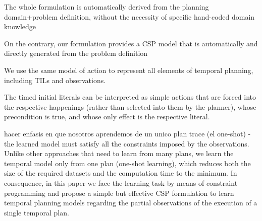 \documentclass[runningheads]{llncs}
\begin{document}
The whole formulation is automatically derived from the planning
domain+problem definition, without the necessity of specific
hand-coded domain knowledge


On the contrary, our formulation provides a CSP
model that is automatically and directly generated from the problem
definition



We use the same model of action to represent all elements of temporal planning, including TILs and observations.

The timed initial literals can be interpreted as simple actions that are forced into the respective happenings (rather than selected into them by the planner), whose precondition is true, and whose only effect is the respective literal.

hacer enfasis en que nosotros aprendemos de un unico plan trace (el one-shot) - the learned model must satisfy all the constraints imposed by the observations. Unlike other approaches that need to learn from many plans, we learn the temporal model only from one plan (one-shot learning), which reduces both the size of the required datasets and the computation time to the minimum. In consequence, in this paper we face the learning task by means of constraint programming and propose a simple but effective CSP formulation to learn temporal planning models regarding the partial observations of the execution of a single temporal plan.

%
%
%


%
\end{document}
